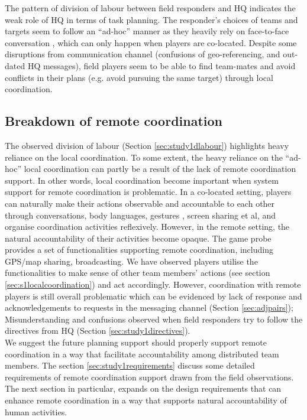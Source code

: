 The pattern of division of labour between field responders and HQ indicates the weak role of HQ in terms of task planning. The responder's choices of teams and targets seem to follow an ``ad-hoc'' manner as they heavily rely on face-to-face conversation , which can only happen when players are co-located. Despite some disruptions from communication channel (confusions of geo-referencing, and out-dated HQ messages), field players seem to be able to find team-mates and avoid conflicts in their plans (e.g. avoid pursuing the same target) through local coordination. 


\subsection{Breakdown of remote coordination}\label{sec:study1breakdown}
The observed division of labour (Section \ref{sec:study1dlabour}) highlights heavy reliance on the local coordination. To some extent, the heavy reliance on the ``ad-hoc'' local coordination can partly be a result of the lack of remote coordination support. In other words, local coordination become important when system support for remote coordination is problematic. In a co-located setting, players can naturally make their actions observable and accountable to each other through conversations, body languages, gestures , screen sharing et al, and organise coordination activities reflexively. However, in the remote setting, the natural accountability of their activities become opaque. The game probe provides a set of functionalities supporting remote coordination, including GPS/map sharing, broadcasting. We have observed players utilise the functionalities to make sense of other team members' actions (see section \ref{sec:s1localcoordination}) and act accordingly. However, coordination with remote players is still overall problematic which can be evidenced by lack of response and acknowledgements to requests in the messaging channel (Section \ref{sec:adjpairs}); Misunderstanding and confusions observed when field responders try to follow the directives from HQ (Section \ref{sec:study1directives}).\\

We suggest the future planning support should properly support remote coordination in a way that facilitate accountability among distributed team members. The section \ref{sec:study1requirements} discuss some detailed requirements of remote coordination support drawn from the field observations. The next section in particular,  expands on the design requirements that can enhance remote coordination in a way that supports natural accountability of human activities.\\

